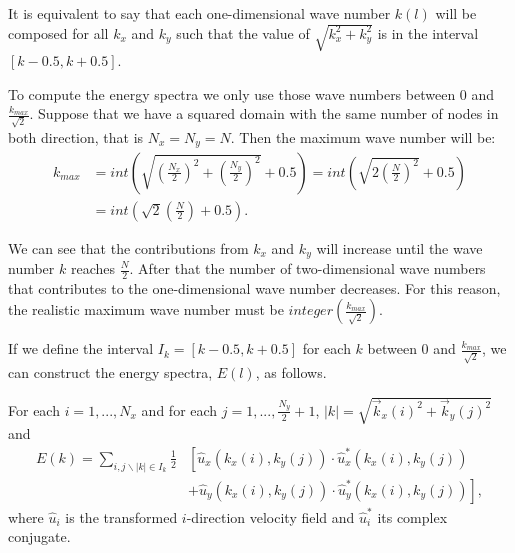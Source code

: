 \begin{itemize}
It is equivalent to say that each one-dimensional wave number $k(l)$ will be composed for all $k_x$ and $k_y$ such that the value of $\sqrt{k_x^2+k_y^2}$ is in the interval $[k-0.5,k+0.5]$.

To compute the energy spectra we only use those wave numbers between $0$ and $\frac{k_{max}}{\sqrt{2}}$. Suppose that we have a squared domain with the same number of nodes in both direction, that is $N_x=N_y=N$. Then the maximum wave number will be:
\begin{align*}
\label{1.12.7}
k_{max}&=int\left(\sqrt{\left(\frac{N_x}{2}\right)^2+\left(\frac{N_y}{2}\right)^2}+0.5\right)=int\left(\sqrt{2\left(\frac{N}{2}\right)^2}+0.5\right)\\
&=int\left(\sqrt{2}\left(\frac{N}{2}\right)+0.5\right).
\end{align*}

We can see that the contributions from $k_x$ and $k_y$ will increase until the wave number $k$ reaches $\frac{N}{2}$. After that the number of two-dimensional wave numbers that contributes to the one-dimensional wave number decreases. For this reason, the realistic maximum wave number must be $integer\left(\frac{k_{max}}{\sqrt{2}}\right)$.

If we define the interval $I_k=[k-0.5,k+0.5]$ for each $k$ between $0$ and $\frac{k_{max}}{\sqrt{2}}$, we can construct the energy spectra, $E(l)$, as follows.

For each $i=1,...,N_x$ and for each $j=1,...,\frac{N_y}{2}+1$, $|k|=\sqrt{\vec{k}_x(i)^2+\vec{k}_y(j)^2}$ and 
\begin{align*}
E(k)=\sum_{i,j\backslash|k|\in I_k}\frac{1}{2}&\left[\hat{u}_x(k_x(i),k_y(j))\cdot\hat{u}_x^*(k_x(i),k_y(j))\right.\\
&\left.+\hat{u}_y(k_x(i),k_y(j))\cdot\hat{u}_y^*(k_x(i),k_y(j))\right],
\end{align*}
where $\hat{u}_i$ is the transformed $i$-direction velocity field and $\hat{u}_i^*$ its complex conjugate.

\end{itemize}

